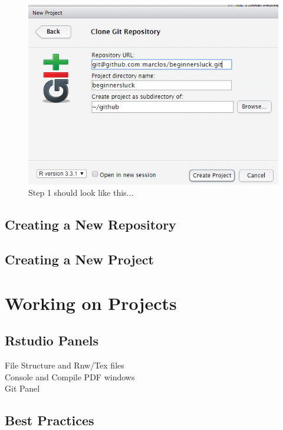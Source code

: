 \documentclass[12pt]{../SOP3_beta}
\begin{document}
\begin{figure}
\includegraphics{graphics/RstudioNewProject3.jpg}
\caption{Step 1 should look like this...}
\end{figure}

\subsection{Creating a New Repository}

\subsection{Creating a New Project}


\section{Working on Projects}

\subsection{Rstudio Panels}

\begin{description}
  \item[File Structure and Rnw/Tex files]
  \item[Console and Compile PDF windows]
  \item[Git Panel]
\end{description}


\subsection{Best Practices}
\end{document}
